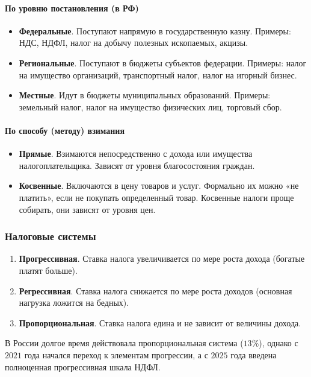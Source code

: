 \documentclass[12pt]{article}
\begin{document}
	\paragraph{По уровню постановления (в РФ)}
	
	\begin{itemize}
		\item \textbf{Федеральные}. Поступают напрямую в государственную казну. Примеры: НДС, НДФЛ, налог на добычу полезных ископаемых, акцизы.
		\item \textbf{Региональные}. Поступают в бюджеты субъектов федерации. Примеры: налог на имущество организаций, транспортный налог, налог на игорный бизнес.
		\item \textbf{Местные}. Идут в бюджеты муниципальных образований. Примеры: земельный налог, налог на имущество физических лиц, торговый сбор.
	\end{itemize}
	
	\paragraph{По способу (методу) взимания}
	
	\begin{itemize}
		\item \textbf{Прямые}. Взимаются непосредственно с дохода или имущества налогоплательщика. Зависят от уровня благосостояния граждан.
		\item \textbf{Косвенные}. Включаются в цену товаров и услуг. Формально их можно «не платить», если не покупать определенный товар. Косвенные налоги проще собирать, они зависят от уровня цен.
	\end{itemize}
	
	\subsubsection{Налоговые системы}
	
	\begin{enumerate}
		\item \textbf{Прогрессивная}. Ставка налога увеличивается по мере роста дохода (богатые платят больше).
		\item \textbf{Регрессивная}. Ставка налога снижается по мере роста доходов (основная нагрузка ложится на бедных).
		\item \textbf{Пропорциональная}. Ставка налога едина и не зависит от величины дохода.
	\end{enumerate}
	\begin{note}
		В России долгое время действовала пропорциональная система ($13\%$), однако с $2021$ года начался переход к элементам прогрессии, а с $2025$ года введена полноценная прогрессивная шкала НДФЛ.
	\end{note}
	
\end{document}
